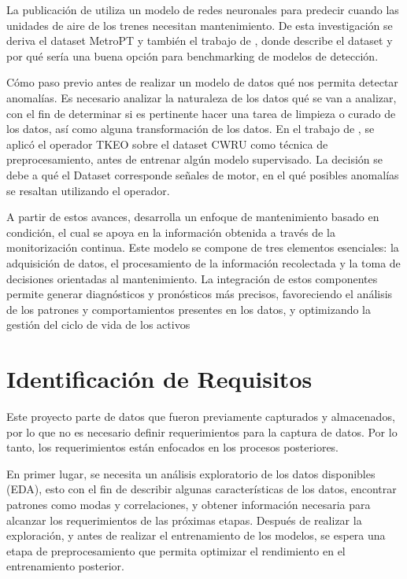 \documentclass[11pt,a4paper,spanish]{book}
\numberwithin{equation}{chapter}
\numberwithin{figure}{chapter}
\begin{document}
La publicación de \cite{davari2021} utiliza un modelo de redes neuronales para predecir cuando las unidades de aire de los trenes necesitan mantenimiento. De esta investigación se deriva el dataset MetroPT y también el trabajo de  \cite{veloso2022metrpt}, donde describe el dataset y por qué sería una buena opción para benchmarking de modelos de detección.


Cómo paso previo antes de realizar un modelo de datos qué nos permita detectar anomalías. Es necesario analizar la naturaleza de los datos qué se van a analizar, con el fin de determinar si es pertinente hacer una tarea de limpieza o curado de los datos, así como alguna transformación de los datos. En el trabajo de \cite{yu2025tkeo}, se aplicó el operador TKEO sobre el dataset CWRU como técnica de preprocesamiento, antes de entrenar algún modelo supervisado. La decisión se debe a qué el Dataset corresponde  señales de motor, en el qué posibles anomalías se resaltan utilizando el operador.


A partir de estos avances, \cite{jardine2006review} desarrolla un enfoque de mantenimiento basado en condición, el cual se apoya en la información obtenida a través de la monitorización continua. Este modelo se compone de tres elementos esenciales: la adquisición de datos, el procesamiento de la información recolectada y la toma de decisiones orientadas al mantenimiento. La integración de estos componentes permite generar diagnósticos y pronósticos más precisos, favoreciendo el análisis de los patrones y comportamientos presentes en los datos, y optimizando la gestión del ciclo de vida de los activos \cite{jardine2006review}


\chapter{Identificación de Requisitos}


Este proyecto parte de datos que fueron previamente capturados y almacenados, por lo que no es necesario definir requerimientos para la captura de datos. Por lo tanto, los requerimientos están enfocados en los procesos posteriores. 


En primer lugar,  se necesita un análisis exploratorio de los datos disponibles (EDA), esto con el fin de describir algunas características de los datos, encontrar patrones como modas y correlaciones, y obtener información necesaria para alcanzar los requerimientos de las próximas etapas.  Después de realizar la exploración, y antes de realizar el entrenamiento de los modelos, se espera una etapa de preprocesamiento que permita optimizar el rendimiento en el entrenamiento posterior.
\end{document}

